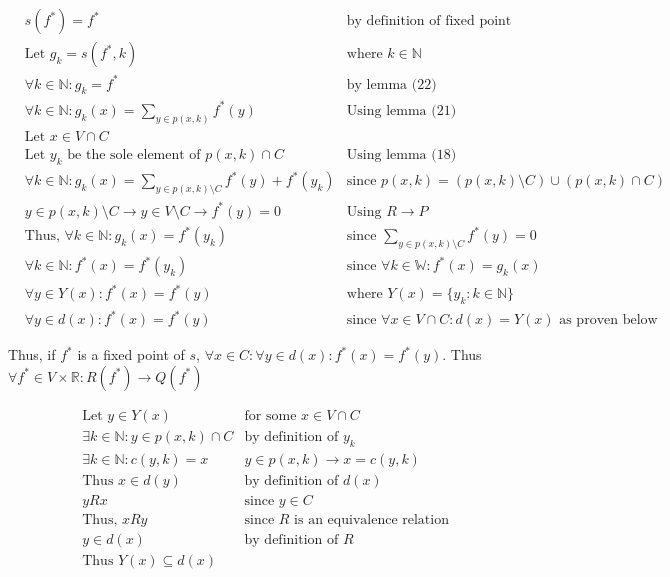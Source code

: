 \documentclass[11pt]{article}
\begin{document}
\begin{align*}
& \text{$s(f^{*})=f^{*}$} & \text{by definition of fixed point} \\
& \text{Let $g_{k} = s(f^{*},k)$} & \text{where $k\in \mathbb{N}$} \\
& \text{$\forall k \in \mathbb{N}: g_{k} = f^{*}$} & \text{by lemma (22)} \\
& \text{$\forall k \in \mathbb{N}: g_{k}(x) = \sum_{y \in p(x,k)} f^{*}(y)$} & \text{Using lemma (21)} \\
& \text{Let $x \in V \cap C$} & \text{} \\
& \text{Let $y_{k}$ be the sole element of $p(x,k)\cap C$} & \text{Using lemma (18)} \\
& \text{$\forall k \in \mathbb{N}: g_{k}(x) = \sum_{y \in p(x,k) \setminus C} f^{*}(y) + f^{*}(y_{k})$} & \text{since $p(x,k) = (p(x,k)\setminus C) \cup (p(x,k)\cap C)$} \\
& \text{$y \in p(x,k)\setminus C \rightarrow y \in V\setminus C \rightarrow f^{*}(y) = 0$} & \text{Using $R\rightarrow P$} \\
& \text{Thus, $\forall k \in \mathbb{N}: g_{k}(x) = f^{*}(y_{k})$} & \text{since $\sum_{y \in p(x,k) \setminus C} f^{*}(y)= 0$} \\
& \text{$\forall k \in \mathbb{N}: f^{*}(x) = f^{*}(y_{k})$} & \text{since $\forall k \in \mathbb{W}: f^{*}(x) = g_{k}(x)$} \\
& \text{$\forall y \in Y(x): f^{*}(x) = f^{*}(y)$} & \text{where $Y(x) = \{y_{k}:k \in \mathbb{N}\}$} \\
& \text{$\forall y \in d(x): f^{*}(x) = f^{*}(y)$} & \text{since $\forall x \in V \cap C: d(x)=Y(x)$ as proven below}
\end{align*}

Thus, if $f^{*}$ is a fixed point of $s$, $\forall x \in C: \forall y \in d(x): f^{*}(x) = f^{*}(y)$. Thus $\forall f^{*} \in V \times \mathbb{R}: R(f^{*}) \rightarrow Q(f^{*})$


\begin{align*}
& \text{Let $y\in Y(x)$} & \text{for some $x \in V \cap C$} \\
& \text{$\exists k \in \mathbb{N}: y \in p(x,k) \cap C$} & \text{by definition of $y_{k}$} \\
& \text{$\exists k \in \mathbb{N}: c(y,k)=x$} & \text{$y \in p(x,k) \rightarrow x=c(y,k)$} \\
& \text{Thus $x \in d(y)$} & \text{by definition of $d(x)$} \\
& \text{$yRx$} & \text{since $y\in C$} \\
& \text{Thus, $xRy$} & \text{since $R$ is an equivalence relation} \\
& \text{$y \in d(x)$} & \text{by definition of $R$} \\
& \text{Thus $Y(x) \subseteq d(x)$} & \text{}
\end{align*}
\end{document}
